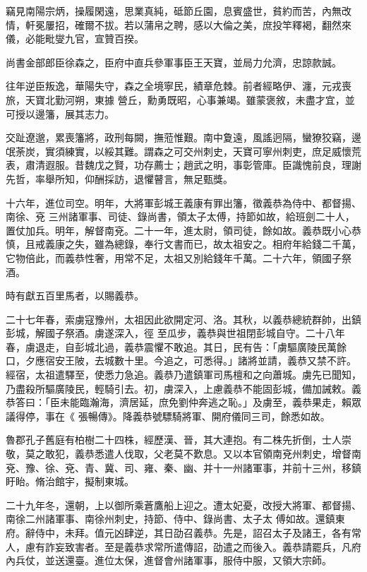 \begin{pinyinscope}
 竊見南陽宗炳，操履閑遠，思業真純，砥節丘園，息賓盛世，貧約而苦，內無改情，軒冕屢招，確爾不拔。若以蒲帛之聘，感以大倫之美，庶投竿釋褐，翻然來儀，必能毗燮九官，宣贊百揆。



 尚書金部郎臣徐森之，臣府中直兵參軍事臣王天寶，並局力允濟，忠諒款誠。



 往年逆臣叛逸，華陽失守，森之全境寧民，績章危棘。前者經略伊、瀍，元戎喪旅，天寶北勤河朔，東據
 營丘，勳勇既昭，心事兼竭。雖蒙褒敘，未盡才宜，並可授以邊籓，展其志力。



 交趾遼邈，累喪籓將，政刑每闕，撫蒞惟艱。南中夐遠，風謠迥隔，蠻獠狡竊，邊氓荼炭，實須練實，以綏其難。謂森之可交州刺史，天寶可寧州刺吏，庶足威懷荒表，肅清遐服。昔魏戊之賢，功存薦士；趙武之明，事彰管庫。臣識愧前良，理謝先哲，率舉所知，仰酬採訪，退懼瞽言，無足甄獎。



 十六年，進位司空。明年，大將軍彭城王義康有罪出籓，徵義恭為侍中、都督揚、南徐、兗
 三州諸軍事、司徒、錄尚書，領太子太傅，持節如故，給班劍二十人，置仗加兵。明年，解督南兗。二十一年，進太尉，領司徒，餘如故。義恭既小心恭慎，且戒義康之失，雖為總錄，奉行文書而已，故太祖安之。相府年給錢二千萬，它物倍此，而義恭性奢，用常不足，太祖又別給錢年千萬。二十六年，領國子祭酒。



 時有獻五百里馬者，以賜義恭。



 二十七年春，索虜寇豫州，太祖因此欲開定河、洛。其秋，以義恭總統群帥，出鎮彭城，解國子祭酒。虜遂深入，徑
 至瓜步，義恭與世祖閉彭城自守。二十八年春，虜退走，自彭城北過，義恭震懼不敢追。其日，民有告：「虜驅廣陵民萬餘口，夕應宿安王陂，去城數十里。今追之，可悉得。」諸將並請，義恭又禁不許。經宿，太祖遣驛至，使悉力急追。義恭乃遣鎮軍司馬檀和之向蕭城。虜先已聞知，乃盡殺所驅廣陵民，輕騎引去。初，虜深入，上慮義恭不能固彭城，備加誡敕。義恭答曰：「臣未能臨瀚海，濟居延，庶免劉仲奔逃之恥。」及虜至，義恭果走，賴眾議得停，事在《
 張暢傳》。降義恭號驃騎將軍、開府儀同三司，餘悉如故。



 魯郡孔子舊庭有柏樹二十四株，經歷漢、晉，其大連抱。有二株先折倒，士人崇敬，莫之敢犯，義恭悉遣人伐取，父老莫不歎息。又以本官領南兗州刺史，增督南兗、豫、徐、兗、青、冀、司、雍、秦、幽、并十一州諸軍事，并前十三州，移鎮盱眙。脩治館宇，擬制東城。



 二十九年冬，還朝，上以御所乘蒼鷹船上迎之。遭太妃憂，改授大將軍、都督揚、南徐二州諸軍事、南徐州刺史，持節、侍中、錄尚書、太子太
 傅如故。還鎮東府。辭侍中，未拜。值元凶肆逆，其日劭召義恭。先是，詔召太子及諸王，各有常人，慮有詐妄致害者。至是義恭求常所遣傳詔，劭遣之而後入。義恭請罷兵，凡府內兵仗，並送還臺。進位太保，進督會州諸軍事，服侍中服，又領大宗師。




\end{pinyinscope}
